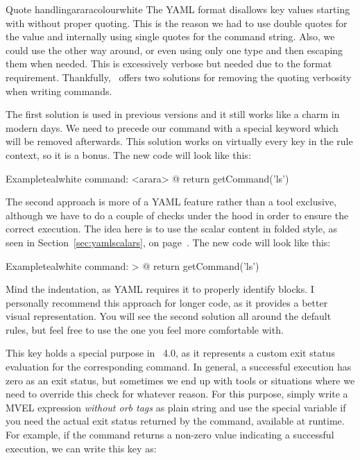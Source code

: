 \begin{description}
\begin{description}
\begin{messagebox}{Quote handling}{araracolour}{\icinfo}{white}
\setlength{\parskip}{1em}
The \gls{YAML} format disallows key values starting with  without proper quoting. This is the reason we had to use double quotes for the value and internally using single quotes for the command string. Also, we could use the other way around, or even using only one type and then escaping them when needed. This is excessively verbose but needed due to the format requirement. Thankfully, \arara\ offers two solutions for removing the quoting verbosity when writing commands.

The first solution is used in previous versions and it still works like a charm in modern days. We need to precede our command with a special keyword  which will be removed afterwards. This solution works on virtually every key in the rule context, so it is a bonus. The new code will look like this:

\begin{codebox}{Example}{teal}{\icnote}{white}
command: <arara> @{ return getCommand('ls') }
\end{codebox}

The second approach is more of a \gls{YAML} feature rather than a tool exclusive, although we have to do a couple of checks under the hood in order to ensure the correct execution. The idea here is to use the scalar content in folded style, as seen in Section~\ref{sec:yamlscalars}, on page~\pageref{sec:yamlscalars}. The new code will look like this:

\begin{codebox}{Example}{teal}{\icnote}{white}
command: >
  @{
    return getCommand('ls')
  }
\end{codebox}

Mind the indentation, as \gls{YAML} requires it to properly identify blocks. I personally recommend this approach for longer code, as it provides a better visual representation. You will see the second solution all around the default rules, but feel free to use the one you feel more comfortable with.
\end{messagebox}

\item[\describecontext{O}{commands}{exit}] This key holds a special purpose in \arara\ 4.0, as it represents a custom exit status evaluation for the corresponding command. In general, a successful execution has zero as an exit status, but sometimes we end up with tools or situations where we need to override this check for whatever reason. For this purpose, simply write a \gls{MVEL} expression \emph{without orb tags} as plain string and use the special variable  if you need the actual exit status returned by the command, available at runtime. For example, if the command returns a non-zero value indicating a successful execution, we can write this key as:


\end{description}
\end{description}
